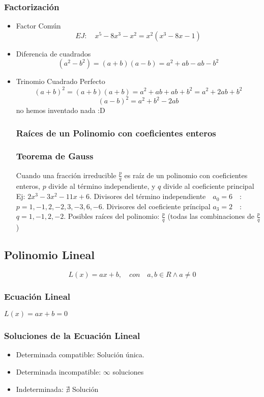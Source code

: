    \subsubsection{Factorización}
\begin{itemize}
 \item Factor Común \[EJ: \quad x^5-8x^3-x^2 = x^2(x^3-8x-1) \]
 \item Diferencia de cuadrados \[ (a^2-b^2)=(a+b)(a-b)= a^2+ab-ab-b^2\]
 \item Trinomio Cuadrado Perfecto \[ (a+b)^2=(a+b)(a+b)= a^2+ab+ab+b^2=a^2+2ab+b^2 \] \[  (a-b)^2=a^2+b^2-2ab \]no hemos inventado nada :D
 
  \subsubsection{Raíces de un Polinomio con coeficientes enteros}
  \subsubsection{Teorema de Gauss}
  Cuando una fracción irreducible $\frac{p}{q}$ es raíz de un polinomio con coeficientes enteros, $p$ divide al término independiente, y $q$ divide al coeficiente principal\newline
  Ej: $2x^3-3x^2-11x+6$. Divisores del término independiente$\quad a_0=6 \quad$: $p=1,-1,2,-2,3,-3,6,-6$. Divisores del coeficiente príncipal $a_3=2 \quad$: $q=1,-1,2,-2$. \newline
  Posibles raíces del polinomio: $\frac{p}{q}$ (todas las combinaciones de $\frac{p}{q}$)
  \end{itemize}
  \subsection{Polinomio Lineal} 
  \[ L(x)=ax+b, \quad con \quad a,b \in R \wedge a \neq 0\]
  \subsubsection{Ecuación Lineal}
  $L(x)=ax+b=0$
  \subsubsection{Soluciones de la Ecuación Lineal}
  \begin{itemize}
  \item Determinada compatible: Solución única.
  \item Determinada incompatible: $\infty$ soluciones
  \item Indeterminada: $\nexists$ Solución
  \end{itemize}
